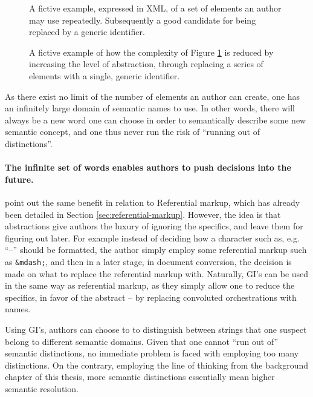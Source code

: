 \documentclass{scrreprt}
\begin{document}
\begin{figure}[h]
\centering
{}
\caption{A fictive example, expressed in XML, of a set of elements an author may use repeatedly. Subsequently a good candidate for being replaced by a generic identifier.}
\label{fig:gi-abstraction-before}
\end{figure}

\begin{figure}[h]
\centering
{}
\caption{A fictive example of how the complexity of Figure \ref{fig:gi-abstraction-before} is reduced by increasing the level of abstraction, through replacing a series of elements with a single, generic identifier.}
\label{fig:gi-abstraction-after}
\end{figure}


As there exist no limit of the number of elements an author can create, one has an infinitely large domain of semantic names to use. In other words, there will always be a new word one can choose in order to semantically describe some new semantic concept, and one thus never run the risk of ``running out of distinctions''.

\paragraph{The infinite set of words enables authors to push decisions into the future.} \citet{coombs} point out the same benefit in relation to Referential markup, which has already been detailed in Section \ref{sec:referential-markup}. However, the idea is that abstractions give authors the luxury of ignoring the specifics, and leave them for figuring out later. For example instead of deciding how a character such as, e.g. ``--'' should be formatted, the author simply employ some referential markup such as \texttt{\&mdash;}, and then in a later stage, in document conversion, the decision is made on what to replace the referential markup with. Naturally, GI's can be used in the same way as referential markup, as they simply allow one to reduce the specifics, in favor of the abstract -- by replacing convoluted orchestrations with names.

Using GI's, authors can choose to to distinguish between strings that one suspect belong to different semantic domains. Given that one cannot ``run out of'' semantic distinctions, no immediate problem is faced with employing too many distinctions. On the contrary, employing the line of thinking from the background chapter of this thesis, more semantic distinctions essentially mean higher semantic resolution. 
\end{document}
